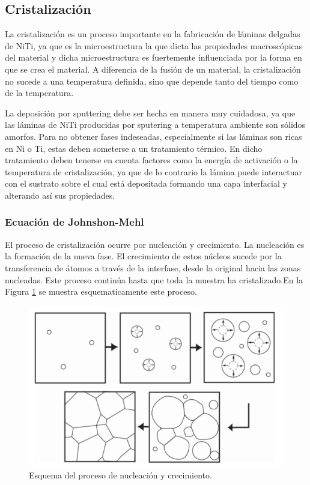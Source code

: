 \documentclass[12pt]{article}
\theoremstyle{definition}
\theoremstyle{remark}
\begin{document}
\subsection{Cristalización}

La cristalización es un proceso importante en la fabricación de láminas delgadas de NiTi, ya que es la microestructura la que dicta las propiedades macroscópicas del material y dicha microestructura es fuertemente influenciada por la forma en que se crea el material. A diferencia de la fusión de un material, la cristalización no sucede a una temperatura definida, sino que depende tanto del tiempo como de la temperatura.

La deposición por sputtering debe ser hecha en manera muy cuidadosa, ya que las láminas de NiTi producidas por sputering a temperatura ambiente son sólidos amorfos. Para no obtener fases indeseadas, especialmente si las láminas son ricas en Ni o Ti, estas deben someterse a un tratamiento térmico. En dicho tratamiento deben tenerse en cuenta factores como la energía de activación o la temperatura de cristalización, ya que de lo contrario la lámina puede interactuar con el sustrato sobre el cual está depositada formando una capa interfacial y alterando así sus propiedades.

\subsubsection{Ecuación de Johnshon-Mehl}

 El proceso de cristalización ocurre por nucleación y crecimiento. La nucleación es la formación de la nueva fase. El crecimiento de estos núcleos sucede por la transferencia de átomos a través de la interfase, desde la original hacia las zonas nucleadas. Este proceso continúa hasta que toda la muestra ha cristalizado.En la Figura \ref{cristalization} se muestra esquematicamente este proceso.
 \begin{figure}[H]
 	\centering
	\includegraphics[scale=0.5]{img/cristalization.png}
 	\caption{Esquema del proceso de nucleación y crecimiento.}
	\label{cristalization}
\end{figure} 
\end{document}
